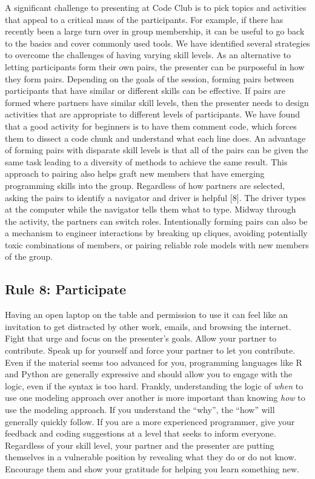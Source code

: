 \documentclass[
  11pt,
]{article}
\begin{document}
A significant challenge to presenting at Code Club is to pick topics and
activities that appeal to a critical mass of the participants. For
example, if there has recently been a large turn over in group
membership, it can be useful to go back to the basics and cover commonly
used tools. We have identified several strategies to overcome the
challenges of having varying skill levels. As an alternative to letting
participants form their own pairs, the presenter can be purposeful in
how they form pairs. Depending on the goals of the session, forming
pairs between participants that have similar or different skills can be
effective. If pairs are formed where partners have similar skill levels,
then the presenter needs to design activities that are appropriate to
different levels of participants. We have found that a good activity for
beginners is to have them comment code, which forces them to dissect a
code chunk and understand what each line does. An advantage of forming
pairs with disparate skill levels is that all of the pairs can be given
the same task leading to a diversity of methods to achieve the same
result. This approach to pairing also helps graft new members that have
emerging programming skills into the group. Regardless of how partners
are selected, asking the pairs to identify a navigator and driver is
helpful {[}8{]}. The driver types at the computer while the navigator
tells them what to type. Midway through the activity, the partners can
switch roles. Intentionally forming pairs can also be a mechanism to
engineer interactions by breaking up cliques, avoiding potentially toxic
combinations of members, or pairing reliable role models with new
members of the group.

\hypertarget{rule-8-participate}{%
\subsection{Rule 8: Participate}\label{rule-8-participate}}

Having an open laptop on the table and permission to use it can feel
like an invitation to get distracted by other work, emails, and browsing
the internet. Fight that urge and focus on the presenter's goals. Allow
your partner to contribute. Speak up for yourself and force your partner
to let you contribute. Even if the material seems too advanced for you,
programming languages like R and Python are generally expressive and
should allow you to engage with the logic, even if the syntax is too
hard. Frankly, understanding the logic of \emph{when} to use one
modeling approach over another is more important than knowing \emph{how}
to use the modeling approach. If you understand the ``why'', the ``how''
will generally quickly follow. If you are a more experienced programmer,
give your feedback and coding suggestions at a level that seeks to
inform everyone. Regardless of your skill level, your partner and the
presenter are putting themselves in a vulnerable position by revealing
what they do or do not know. Encourage them and show your gratitude for
helping you learn something new.
\end{document}
